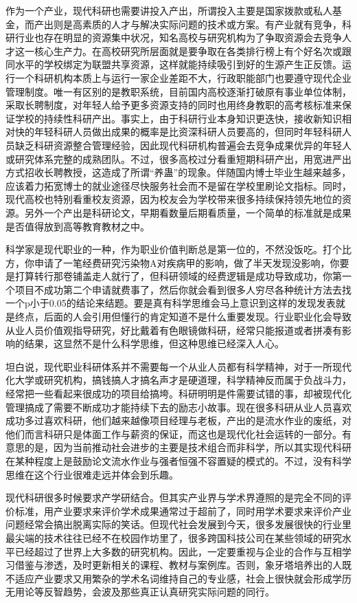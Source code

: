 \documentclass[]{tufte-book}
\begin{document}
作为一个产业，现代科研也需要讲投入产出，所谓投入主要是国家拨款或私人基金，而产出则是高素质的人才与解决实际问题的技术或方案。有产业就有竞争，科研行业也存在明显的资源集中状况，知名高校与研究机构为了争取资源会去竞争人才这一核心生产力。在高校研究所层面就是要争取在各类排行榜上有个好名次或跟同水平的学校绑定为联盟共享资源，这样就能持续吸引到好的生源产生正反馈。运行一个科研机构本质上与运行一家企业差距不大，行政职能部门也要遵守现代企业管理制度。唯一有区别的是教职系统，目前国内高校逐渐打破原有事业单位体制，采取长聘制度，对年轻人给予更多资源支持的同时也用终身教职的高考核标准来保证学校的持续性科研产出。事实上，由于科研行业本身知识更迭快，接收新知识相对快的年轻科研人员做出成果的概率是比资深科研人员要高的，但同时年轻科研人员缺乏科研资源整合管理经验，因此现代科研机构普遍会去竞争成果优异的年轻人或研究体系完整的成熟团队。不过，很多高校过分看重短期科研产出，用宽进严出方式招收长聘教授，这造成了所谓``养蛊''的现象。伴随国内博士毕业生越来越多，应该着力拓宽博士的就业途径尽快服务社会而不是留在学校里刷论文指标。同时，现代高校也特别看重校友资源，因为校友会为学校带来很多持续保持领先地位的资源。另外一个产出是科研论文，早期看数量后期看质量，一个简单的标准就是成果是否值得放到高等教育教材之中。

科学家是现代职业的一种，作为职业价值判断总是第一位的，不然没饭吃。打个比方，你申请了一笔经费研究污染物A对疾病甲的影响，做了半天发现没影响，你要是打算转行那卷铺盖走人就行了，但科研领域的经费逻辑是成功导致成功，你第一个项目不成功第二个申请就费事了，然后你就会看到很多人穷尽各种统计方法去找一个p小于0.05的结论来结题。要是真有科学思维会马上意识到这样的发现发表就是终点，后面的人会引用但懂行的肯定知道不是什么重要发现。行业职业化会导致从业人员价值观指导研究，好比戴着有色眼镜做科研，经常只能报道或者拼凑有影响的结果，这显然不是什么科学思维，但这种思维已经深入人心。

坦白说，现代职业科研体系并不需要每一个从业人员都有科学精神，对于一所现代化大学或研究机构，搞钱搞人才搞名声才是硬道理，科学精神反而属于负战斗力，经常把一些看起来很成功的项目给搞垮。科研明明是件需要试错的事，却被现代化管理搞成了需要不断成功才能持续下去的励志小故事。现在很多科研从业人员喜欢成功多过喜欢科研，他们越来越像项目经理与老板，产出的是流水作业的废纸，对他们而言科研只是体面工作与薪资的保证，而这也是现代化社会运转的一部分。有意思的是，因为当前推动社会进步的主要是技术组合而非科学，所以其实现代科研在某种程度上是鼓励论文流水作业与强者恒强不容置疑的模式的。不过，没有科学思维在这个行业很难走远并体会到乐趣。

现代科研很多时候要求产学研结合。但其实产业界与学术界遵照的是完全不同的评价标准，用产业要求来评价学术成果通常过于超前了，同时用学术要求来评价产业问题经常会搞出脱离实际的笑话。但现代社会发展到今天，很多发展很快的行业里最尖端的技术往往已经不在校园作坊里了，很多跨国科技公司在某些领域的研究水平已经超过了世界上大多数的研究机构。因此，一定要重视与企业的合作与互相学习借鉴与渗透，及时更新相关的课程、教材与案例库。否则，象牙塔培养出的人既不适应产业要求又用繁杂的学术名词维持自己的专业感，社会上很快就会形成学历无用论等反智趋势，会波及那些真正认真研究实际问题的同行。
\end{document}
